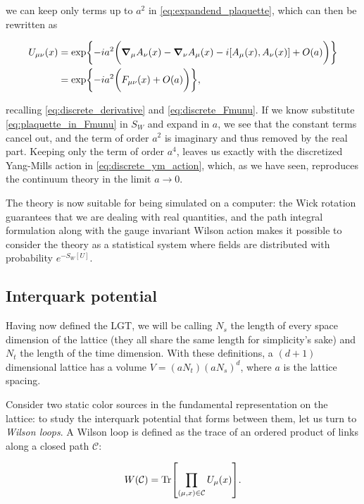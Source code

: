 \documentclass[reqno,12pt]{article}
\numberwithin{equation}{section}
\begin{document}
we can keep only terms up to $a^2$ in \eqref{eq:expandend_plaquette}, which can then be rewritten as

\begin{equation} \label{eq:plaquette_in_Fmunu}
	\begin{aligned}
		U_{\mu\nu}(x) &= \exp{-ia^2\biggl( \grad_\mu A_\nu(x) - \grad_\nu A_\mu(x) - i\qty[A_\mu(x), A_\nu(x)] + O(a) \biggr)} \\
		&= \exp{-ia^2 \biggl(F_{\mu\nu}(x) + O(a)\biggr)},
	\end{aligned}
\end{equation}

recalling \eqref{eq:discrete_derivative} and \eqref{eq:discrete_Fmunu}. If we know substitute \eqref{eq:plaquette_in_Fmunu}
in $S_W$ and expand in $a$, we see that the constant terms cancel out, and the term of order $a^2$ is imaginary and thus removed by
the real part. Keeping only the term of order $a^4$, leaves us exactly with the discretized Yang-Mills action in 
\eqref{eq:discrete_ym_action}, which, as we have seen, reproduces the continuum theory in the limit $a \rightarrow 0$.

The theory is now suitable for being simulated on a computer: the Wick rotation guarantees that we are dealing with
real quantities, and the path integral formulation along with the gauge invariant Wilson action makes it possible
to consider the theory as a statistical system where fields are distributed with probability $e^{-S_W[U]}$.

\subsection{Interquark potential} \label{potential}

Having now defined the LGT, we will be calling $N_s$ the length of every space dimension of the lattice (they 
all share the same length for simplicity's sake) and $N_t$ the length of the time dimension. With these definitions,
a $(d+1)$ dimensional lattice has a volume $V = (aN_t)(aN_s)^d$, where $a$ is the lattice spacing.

Consider two static color sources in the fundamental representation
on the lattice: to study the interquark potential that forms between them,
let us turn to \textit{Wilson loops}. A Wilson loop is defined as the trace of an ordered product 
of links along a closed path $\mathcal{C}$:

\begin{equation}
	W(\mathcal{C}) = \Tr[\prod_{(\mu,x)\in\mathcal{C}} U_\mu(x)].
\end{equation}
\end{document}
